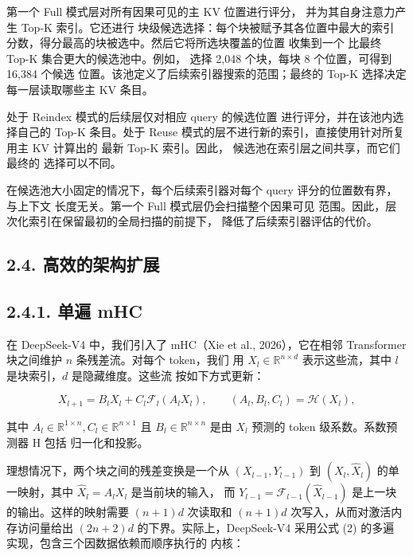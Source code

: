 第一个 Full 模式层对所有因果可见的主 KV 位置进行评分，
并为其自身注意力产生 Top-K 索引。它还进行
块级候选选择：每个块被赋予其各位置中最大的索引
分数，得分最高的块被选中。然后它将所选块覆盖的位置
收集到一个
比最终 Top-K 集合更大的候选池中。例如，
选择 2,048 个块，每块 8 个位置，可得到 16,384 个候选
位置。该池定义了后续索引器搜索的范围；最终的
Top-K 选择决定每一层读取哪些主 KV 条目。

处于 Reindex 模式的后续层仅对相应 query 的候选位置
进行评分，并在该池内选择自己的 Top-K 条目。处于 Reuse
模式的层不进行新的索引，直接使用针对所复用主 KV 计算出的
最新 Top-K 索引。因此，
候选池在索引层之间共享，而它们最终的
选择可以不同。

在候选池大小固定的情况下，每个后续索引器对每个
query 评分的位置数有界，与上下文
长度无关。第一个 Full 模式层仍会扫描整个因果可见
范围。因此，层次化索引在保留最初的全局扫描的前提下，
降低了后续索引器评估的代价。

\subsection{2.4. 高效的架构扩展}\label{efficient-architectural-extensions}

\subsection{2.4.1. 单遍 mHC}\label{single-pass-mhc}

在 DeepSeek-V4 中，我们引入了 mHC（Xie et al., 2026），它在相邻 Transformer
块之间维护 $n$ 条残差流。对每个 token，我们
用 \(X _ { l } \in \mathbb { R } ^ { n \times d }\)
表示这些流，其中 $l$ 是块索引，$d$ 是隐藏维度。这些流
按如下方式更新：

\[
X _ { l + 1 } = B _ { l } X _ { l } + C _ { l } { \mathcal { F } } _ { l } ( A _ { l } X _ { l } ) , \qquad ( A _ { l } , B _ { l } , C _ { l } ) = { \mathcal { H } } ( X _ { l } ) ,\tag{2}
\]

其中
\(A _ { l } \in \mathbb { R } ^ { 1 \times n } , C _ { l } \in \mathbb { R } ^ { n \times 1 }\)
且 \(B _ { l } \in \mathbb { R } ^ { n \times n }\) 是由 $X_l$ 预测的
token 级系数。系数预测器 H 包括
归一化和投影。

理想情况下，两个块之间的残差变换是一个从
\(\left( X _ { l - 1 } , Y _ { l - 1 } \right)\) 到
\(( X _ { l } , \hat { X } _ { l } )\) 的单一映射，其中
\(\hat { X } _ { l } = A _ { l } X _ { l }\) 是当前块的输入，
而
\(Y _ { l - 1 } = \mathcal { F } _ { l - 1 } ( \hat { X } _ { l - 1 } )\)
是上一块的输出。这样的映射需要 $(n + 1)d$ 次读取和
\(( n + 1 ) d\) 次写入，从而对激活内存访问量给出
\(( 2 n + 2 ) d\) 的下界。实际上，DeepSeek-V4 采用公式 (2) 的多遍
实现，包含三个因数据依赖而顺序执行的
内核：

